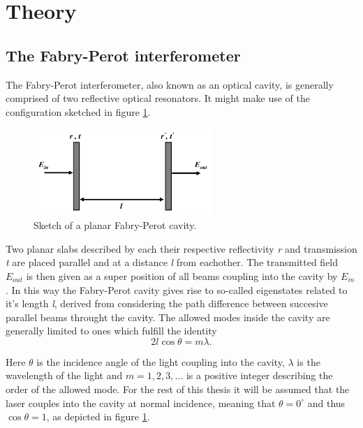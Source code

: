 \section{Theory}
\subsection{The Fabry-Perot interferometer}\label{sec:fabry_perot}

The Fabry-Perot interferometer, also known as an optical cavity, is generally comprised of two reflective optical resonators. It might make use of the configuration sketched in figure \ref{fig:planar_fabry-perot}. 


\begin{figure}[h!]
    \centering
    \includegraphics[width=0.6\textwidth]{figures/planar_fabry_perot.pdf}
    \caption{Sketch of a planar Fabry-Perot cavity.}
    \label{fig:planar_fabry-perot}
\end{figure}

Two planar slabs described by each their respective reflectivity \emph{r} and transmission \emph{t} are placed parallel and at a distance \emph{l} from eachother. The transmitted field $E_{out}$ is then given as a super position of all beams coupling into the cavity by $E_{in}$. In this way the Fabry-Perot cavity gives rise to so-called eigenstates\cite{Eichhorn} related to it's length \emph{l}, derived from considering the path difference between succesive parallel beams throught the cavity. The allowed modes inside the cavity are generally limited to ones which fulfill the identity\cite{Pedrotti}
\begin{equation}
    2 l \cos \theta = m \lambda.
    \label{eq:general_cavity_condition}
\end{equation}

Here $\theta$ is the incidence angle of the light coupling into the cavity, $\lambda$ is the wavelength of the light and $m = 1,2,3,...$ is a positive integer describing the order of the allowed mode. For the rest of this thesis it will be assumed that the laser couples into the cavity at normal incidence, meaning that $\theta = 0^{\circ}$ and thus $\cos \theta = 1$, as depicted in figure \ref{fig:planar_fabry-perot}.

